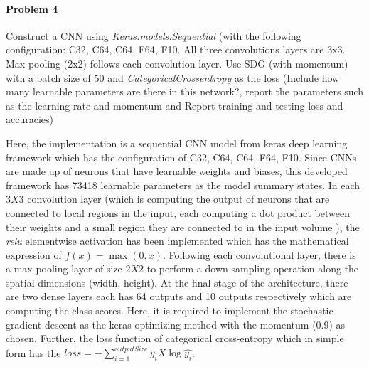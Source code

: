 \documentclass[11pt]{scrartcl}
\begin{document}
{\paragraph*{Problem 4}
Construct a CNN using \textit{Keras.models.Sequential} (with the following configuration: C32, C64, C64, F64, F10. All three convolutions layers are 3x3. Max pooling (2x2) follows each convolution layer. Use SDG (with momentum) with a batch size of 50 and \textit{CategoricalCrossentropy} as the loss (Include how many learnable parameters are there in this network?, report the parameters such as the learning rate and momentum and Report training and testing loss and accuracies)

Here, the implementation is a sequential CNN model from keras deep learning framework which has the configuration of C32, C64, C64, F64, F10. Since CNNs are made up of neurons that have learnable weights and biases, this developed framework has 73418 learnable parameters as the model summary states. In each $3X3$ convolution layer (which is computing the output of neurons that are connected to local regions in the input, each computing a dot product between their weights and a small region they are connected to in the input volume \cite{web1}), the \textit{relu} elementwise activation has been implemented which has the mathematical expression of $f(x)=\max(0,x)$. Following each convolutional layer, there is a max pooling layer of size $2X2$ to perform a down-sampling operation along the spatial dimensions (width, height). At the final stage of the architecture, there are two dense layers each has 64 outputs and 10 outputs respectively which are computing the class scores. Here, it is required to implement the stochastic gradient descent as the keras optimizing method with the momentum (0.9) as chosen. Further, the loss function of categorical cross-entropy which in simple form has the $loss=-\sum_{i=1}^{outputSize} y_iX\log{\hat{y_i}}$.  

}
\end{document}
